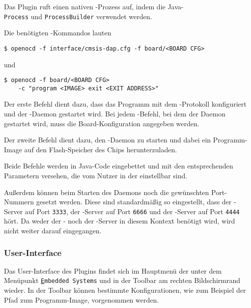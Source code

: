         Das Plugin ruft einen nativen -Prozess auf, indem die Java-\\\texttt{Process} und
        \texttt{ProcessBuilder} verwendet werden.

        Die benötigten -Kommandos lauten
        \begin{Verbatim}[frame=single]
$ openocd -f interface/cmsis-dap.cfg -f board/<BOARD CFG>
        \end{Verbatim}
        und
        \begin{Verbatim}[frame=single]
$ openocd -f board/<BOARD CFG>
    -c "program <IMAGE> exit <EXIT ADDRESS>"
        \end{Verbatim}

        Der erste Befehl dient dazu, dass das Programm  mit dem -Protokoll
        konfiguriert und der -Daemon gestartet wird. Bei jedem -Befehl, bei dem
        der Daemon gestartet wird, muss die Board-Konfiguration angegeben werden.

        Der zweite Befehl dient dazu, den -Daemon zu starten und dabei ein Programm-Image auf den Flash-Speicher
        des Chips herunterzuladen.

        Beide Befehle werden in Java-Code eingebettet und mit den entsprechenden Parametern versehen, die vom Nutzer
        in der  einstellbar sind.

        Außerdem können beim Starten des Daemons noch die gewünschten Port\hyp{}Nummern gesetzt werden. Diese sind
        standardmäßig so eingestellt, dass der -Server auf Port \texttt{3333}, der -Server auf Port
        \texttt{6666} und der -Server auf Port \texttt{4444} hört. Da weder der - noch der -Server
        in diesem Kontext benötigt wird, wird nicht weiter darauf eingegangen.

        \subsubsection{User-Interface}
        Das User-Interface des Plugins findet sich im Hauptmenü der  unter dem Menüpunkt
        \texttt{\underline{E}mbedded Systems} und in der Toolbar am rechten Bildschirmrand wieder.
        In der Toolbar können bestimmte Konfigurationen, wie zum Beispiel der Pfad zum Programm-Image, vorgenommen werden.

